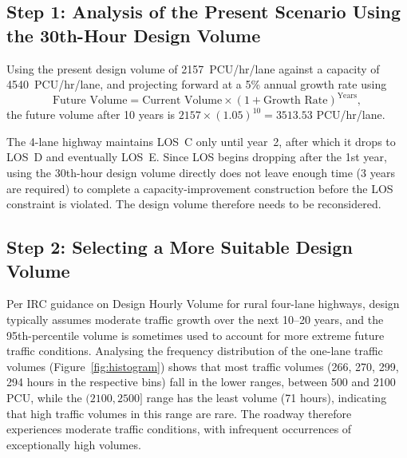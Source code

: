 \documentclass[11pt]{article}
\begin{document}
\subsection{Step 1: Analysis of the Present Scenario Using the 30th-Hour Design Volume}
Using the present design volume of 2157~PCU/hr/lane against a capacity of 4540~PCU/hr/lane, and
projecting forward at a 5\% annual growth rate using
\[
\text{Future Volume} = \text{Current Volume} \times (1+\text{Growth Rate})^{\text{Years}},
\]
the future volume after 10 years is $2157 \times (1.05)^{10} = 3513.53$ PCU/hr/lane.

\begin{table}[H]
  \centering
  \caption{4-lane divided highway: design volume, v/c ratio, and LOS over 10 years, based on the 30th-hour design volume.}
\end{table}

The 4-lane highway maintains LOS~C only until year~2, after which it drops to LOS~D and eventually
LOS~E. Since LOS begins dropping after the 1st year, using the 30th-hour design volume directly does not
leave enough time (3 years are required) to complete a capacity-improvement construction before the LOS
constraint is violated. The design volume therefore needs to be reconsidered.

\subsection{Step 2: Selecting a More Suitable Design Volume}
Per IRC guidance on Design Hourly Volume for rural four-lane highways, design typically assumes moderate
traffic growth over the next 10--20 years, and the 95th-percentile volume is sometimes used to account
for more extreme future traffic conditions. Analysing the frequency distribution of the one-lane traffic
volumes (Figure~\ref{fig:histogram}) shows that most traffic volumes (266, 270, 299, 294 hours in the
respective bins) fall in the lower ranges, between 500 and 2100 PCU, while the $(2100,2500]$ range has
the least volume (71 hours), indicating that high traffic volumes in this range are rare. The roadway
therefore experiences moderate traffic conditions, with infrequent occurrences of exceptionally high
volumes.
\end{document}
